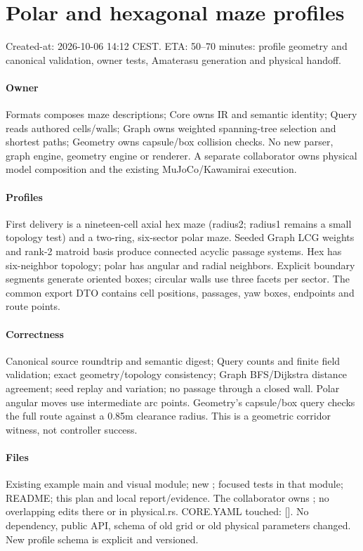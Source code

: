 \documentclass{article}
\begin{document}
\section*{Polar and hexagonal maze profiles}
Created-at: 2026-10-06 14:12 CEST. ETA: 50--70 minutes: profile geometry and
canonical validation, owner tests, Amaterasu generation and physical handoff.

\paragraph{Owner} Formats composes maze descriptions; Core owns IR and semantic
identity; Query reads authored cells/walls; Graph owns weighted spanning-tree
selection and shortest paths; Geometry owns capsule/box collision checks.
No new parser, graph engine, geometry engine or renderer. A separate collaborator
owns physical model composition and the existing MuJoCo/Kawamirai execution.

\paragraph{Profiles} First delivery is a nineteen-cell axial hex maze (radius2;
radius1 remains a small topology test) and a
two-ring, six-sector polar maze. Seeded Graph LCG weights and rank-2 matroid
basis produce connected acyclic passage systems. Hex has six-neighbor topology;
polar has angular and radial neighbors. Explicit boundary segments generate
oriented boxes; circular walls use three facets per sector. The common export
DTO contains cell positions, passages, yaw boxes, endpoints and route points.

\paragraph{Correctness} Canonical source roundtrip and semantic digest;
Query counts and finite field validation; exact geometry/topology consistency;
Graph BFS/Dijkstra distance agreement; seed replay and variation; no passage
through a closed wall. Polar angular moves use intermediate arc points.
Geometry's capsule/box query checks the full route against a 0.85m clearance
radius. This is a geometric corridor witness, not controller success.

\paragraph{Files} Existing example main and visual module; new
; focused tests in that
module; README; this plan and local report/evidence. The collaborator owns
; no overlapping edits there or in physical.rs.
CORE.YAML touched: []. No dependency, public API, schema of old grid or old
physical parameters changed. New profile schema is explicit and versioned.
\end{document}
